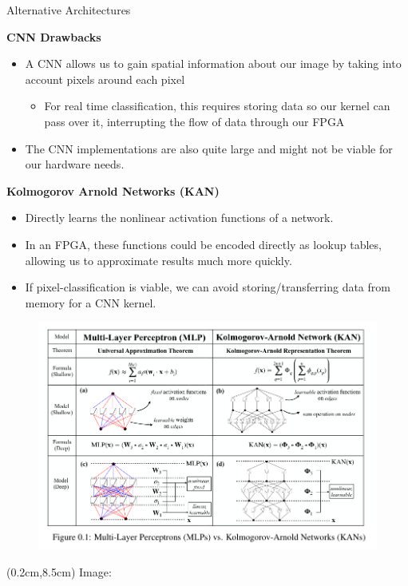 \documentclass[aspectratio=169,xcolor=dvipsnames]{beamer}
\newcommand\myheading[1]{%
  \par\bigskip
  {\Large\bfseries#1}\par\smallskip}
\begin{document}
\begin{frame}{Alternative Architectures}
    \myheading{CNN Drawbacks}
    \begin{itemize}
        \item A CNN allows us to gain spatial information about our image by taking into account pixels around each pixel
        \begin{itemize}
            \item For real time classification, this requires storing data so our kernel can pass over it, interrupting the flow of data through our FPGA
        \end{itemize}
        \item The CNN implementations are also quite large and might not be viable for our hardware needs.
    \end{itemize}
    

    \myheading{Kolmogorov Arnold Networks (KAN)}
    \begin{itemize}
        \item Directly learns the nonlinear activation functions of a network.
        \item In an FPGA, these functions could be encoded directly as lookup tables, allowing us to approximate results much more quickly.
        \item If pixel-classification is viable, we can avoid storing/transferring data from memory for a CNN kernel. 
    \end{itemize}
\end{frame}

\begin{frame}
    \begin{figure}
        \includegraphics[width=0.75\linewidth]{mlpkan.png} 
    \end{figure}


    \begin{textblock*}{5cm}(0.2cm,8.5cm)
        \tiny Image: \cite{kan}
    \end{textblock*}

\end{frame}
\end{document}
